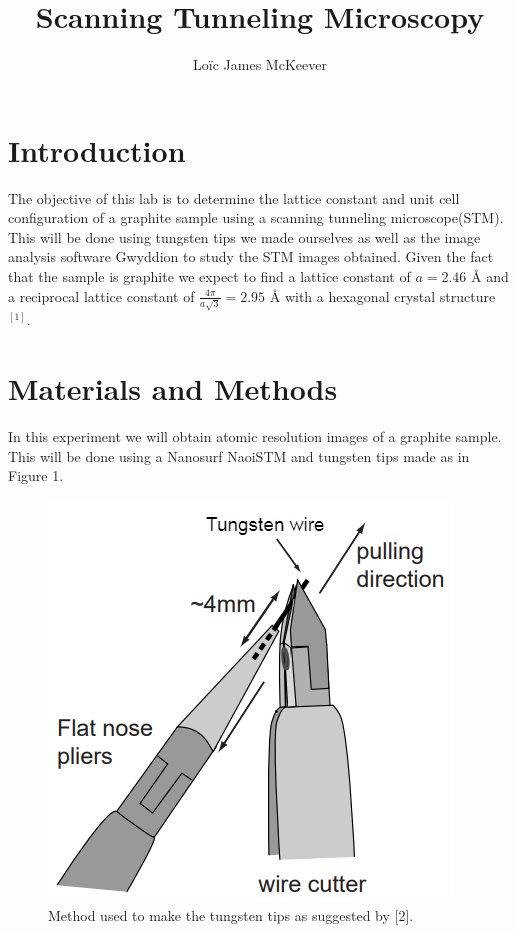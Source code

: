 \documentclass{article}
\begin{document}
\title{Scanning Tunneling Microscopy}
\author{Loïc James McKeever}

\maketitle

\section{Introduction}

The objective of this lab is to determine the lattice constant and unit cell configuration of a graphite sample using a scanning tunneling microscope(STM).  This will be done using tungsten tips we made ourselves as well as the image analysis software Gwyddion to study the STM images obtained.  Given the fact that the sample is graphite we expect to find a lattice constant of $a=2.46$ {\AA} and a reciprocal lattice constant of $\frac{4\pi}{a\sqrt{3}}=2.95$ {\AA} with a hexagonal crystal structure$^{[1]}$.  


\section{Materials and Methods}

In this experiment we will obtain atomic resolution images of a graphite sample.  This will be done using a Nanosurf NaoiSTM and tungsten tips made as in Figure 1. 

\begin{figure}[H]
\includegraphics[scale=.4,center]{TipMaking.png}
\caption{Method used to make the tungsten tips as suggested by [2].}
\end{figure}
\end{document}
